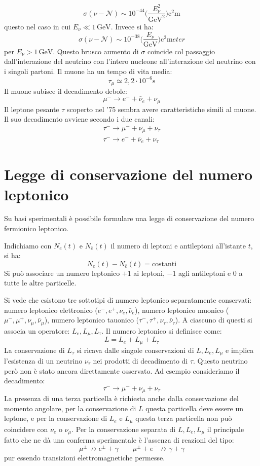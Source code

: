 \[
\sigma(\nu-\mathcal{N})\sim 
10^{-44}\biggl(\frac{E_{\nu}^2}{\si{\giga\electronvolt}^2}\biggr)
\si{\square\centi\meter}
\]
questo nel caso in cui $E_{\nu}\ll 1\,\si{\giga\electronvolt}$. Invece si ha:
\[
\sigma(\nu-\mathcal{N})\sim 
10^{-38}\biggl(\frac{E_{\nu}}{\si{\giga\electronvolt}}\biggr)\si{\square\centi\m
eter}
\]
per $E_{\nu}> 1\,\si{\giga\electronvolt}$. Questo brusco aumento di $\sigma$ 
coincide col passaggio
dall'interazione del neutrino con l'intero nucleone all'interazione del 
neutrino con i singoli partoni.
Il muone ha un tempo di vita media:
\[
\tau_{\mu}\simeq 2,2\cdot 10^{-6}\si{\second}
\]
Il muone subisce il decadimento debole:
\[
\mu^-\rightarrow e^-+\bar{\nu}_e+\nu_{\mu}
\]
Il leptone pesante $\tau$ scoperto nel '75 sembra avere caratteristiche simili 
al muone. Il suo decadimento
avviene secondo i due canali:
\begin{gather}
\tau^-\rightarrow\mu^-+\bar{\nu_{\mu}}+\nu_{\tau}\\
\tau^-\rightarrow e^-+\bar{\nu}_e+\nu_{\tau}
\end{gather}

\section{Legge di conservazione del numero leptonico}
Su basi sperimentali è possibile formulare una legge di conservazione del 
numero fermionico leptonico.

Indichiamo con $N_e(t)$ e $N_{\bar{e}}(t)$ il numero di leptoni e antileptoni 
all'istante $t$, si ha:
\[
N_e(t)-N_{\bar{e}}(t)=\text{costanti}
\]
Si può associare un numero leptonico $+1$ ai leptoni, $-1$ agli antileptoni e 
$0$ a tutte le altre particelle.

Si vede che esistono tre sottotipi di numero leptonico separatamente 
conservati: numero leptonico
elettronico ($e^-,e^+,\nu_e,\bar{\nu}_e$), numero leptonico muonico 
($\mu^-,\mu^+,\nu_{\mu},\bar{\nu}_{\mu}$),
numero leptonico tauonico ($\tau^-,\tau^+,\nu_{\tau},\bar{\nu}_{\tau}$).
A ciascuno di questi si associa un operatore: $L_e,L_{\mu},L_{\tau}$. Il numero 
leptonico si definisce come:
\[
L=L_e+L_{\mu}+L_{\tau}
\]
La conservazione di $L_{\tau}$ si ricava dalle singole conservazioni di 
$L,L_e,L_{\mu}$ e implica l'esistenza di un neutrino $\nu_{\tau}$ nei prodotti 
di decadimento di $\tau$.
Questo neutrino però non è stato ancora direttamente osservato. Ad esempio 
consideriamo il decadimento:
\[
\tau^-\rightarrow\mu^-+\nu_{\mu}+\nu_{\tau}
\]
La presenza di una terza particella è richiesta anche dalla conservazione del 
momento angolare, per la
conservazione di $L$ questa particella deve essere un leptone, e per la 
conservazione di $L_e$ e $L_{\mu}$ questa
terza particella non può coincidere con $\nu_e$ o $\nu_{\mu}$.
Per la conservazione separata di $L,L_e,L_{\mu}$ il principale fatto che ne dà 
una conferma sperimentale è
l'assenza di reazioni del tipo:
\[
\mu^{\pm}\nrightarrow e^{\pm}+\gamma\qquad\mu^{\pm}+e^-\nrightarrow\gamma+\gamma
\]
pur essendo transizioni elettromagnetiche permesse.

